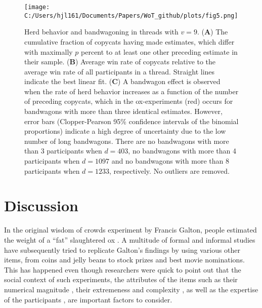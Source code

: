 \documentclass[9pt,twocolumn,twoside,lineno]{article}
\begin{document}
\begin{SCfigure*}[\sidecaptionrelwidth][t]
\centering
\texttt{[image: C:/Users/hjl161/Documents/Papers/WoT\_github/plots/fig5.png]}
\caption{Herd behavior and bandwagoning in threads with $v=9$. (\textbf{A}) The cumulative fraction of copycats having made estimates, which differ with maximally $p$ percent to at least one other preceding estimate in their sample. (\textbf{B}) Average win rate of copycats relative to the average win rate of all participants in a thread. Straight lines indicate the best linear fit. (\textbf{C}) A bandwagon effect is observed when the rate of herd behavior increases as a function of the number of preceding copycats, which in the ox-experiments (red) occurs for bandwagons with more than three identical estimates. However, error bars (Clopper-Pearson 95\% confidence intervals of the binomial proportions) indicate a high degree of uncertainty due to the low number of long bandwagons. There are no bandwagons with more than 3 participants when $d=403$, no bandwagons with more than 4 participants when $d=1097$ and no bandwagons with more than 8 participants when $d=1233$, respectively. No outliers are removed.}\label{fig:5}
\end{SCfigure*}

\section*{Discussion}
In the original wisdom of crowds experiment by Francis Galton, people estimated the weight of a “fat” slaughtered ox \cite{galton1907vox}. A multitude of formal and informal studies have subsequently tried to replicate Galton’s findings by using various other items, from coins and jelly beans to stock prizes and best movie nominations. This has happened even though researchers were quick to point out that the social context of such experiments, the attributes of the items such as their numerical magnitude \cite{izard2008calibrating, krueger1982single}, their extremeness and complexity \cite{nash2014curious, taleb2009errors}, as well as the expertise of the participants \cite{perry1907ballot}, are important factors to consider. 
\end{document}
